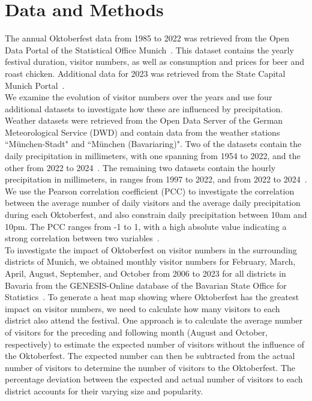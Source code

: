 \documentclass{article}
\theoremstyle{plain}
\theoremstyle{definition}
\theoremstyle{remark}
\begin{document}
\section{Data and Methods}\label{sec:methods}
The annual Oktoberfest data from 1985 to 2022 was retrieved from the Open Data Portal of the Statistical Office Munich~\citep{5}. This dataset contains the yearly festival duration, visitor numbers, as well as consumption and prices for beer and roast chicken. Additional data for 2023 was retrieved from the State Capital Munich Portal~\citep{6,7}. \\
We examine the evolution of visitor numbers over the years and use four additional datasets to investigate how these are influenced by precipitation. Weather datasets were retrieved from the Open Data Server of the German Meteorological Service (DWD) and contain data from the weather stations ``München-Stadt" and ``München (Bavariaring)". Two of the datasets contain the daily precipitation in millimeters, with one spanning from 1954 to 2022, and the other from 2022 to 2024~\citep{3,4}. The remaining two datasets contain the hourly precipitation in millimeters, in ranges from 1997 to 2022, and from 2022 to 2024~\citep{1,2}. We use the Pearson correlation coefficient (PCC) to investigate the correlation between the average number of daily visitors and the average daily precipitation during each Oktoberfest, and also constrain daily precipitation between 10am and 10pm. The PCC ranges from -1 to 1, with a high absolute value indicating a strong correlation between two variables~\cite{thonield}.\\
To investigate the impact of Oktoberfest on visitor numbers in the surrounding districts of Munich, we obtained monthly visitor numbers for February, March, April, August, September, and October from 2006 to 2023 for all districts in Bavaria from the GENESIS-Online database of the Bavarian State Office for Statistics~\citep{table_GENESIS}.
To generate a heat map showing where Oktoberfest has the greatest impact on visitor numbers, we need to calculate how many visitors to each district also attend the festival. One approach is to calculate the average number of visitors for the preceding and following month (August and October, respectively) to estimate the expected number of visitors without the influence of the Oktoberfest. The expected number can then be subtracted from the actual number of visitors to determine the number of visitors to the Oktoberfest. The percentage deviation between the expected and actual number of visitors to each district accounts for their varying size and popularity.\\
\end{document}
